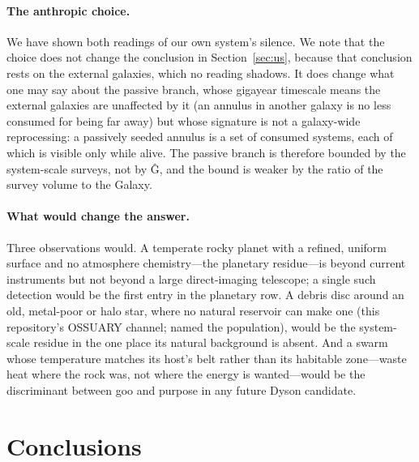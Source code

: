 \documentclass[11pt]{article}
\newcommand{\Ghat}{\^{G}\xspace}
\begin{document}
\paragraph{The anthropic choice.}  We have shown both readings of our own
system's silence.  We note that the choice does not change the conclusion in
Section~\ref{sec:us}, because that conclusion rests on the external galaxies,
which no reading shadows.  It does change what one may say about the passive
branch, whose gigayear timescale means the external galaxies are unaffected by
it (an annulus in another galaxy is no less consumed for being far away) but
whose signature is not a galaxy-wide reprocessing: a passively seeded annulus
is a set of consumed systems, each of which is visible only while alive.  The
passive branch is therefore bounded by the system-scale surveys, not by \Ghat,
and the bound is weaker by the ratio of the survey volume to the Galaxy.

\paragraph{What would change the answer.}  Three observations would.  A
temperate rocky planet with a refined, uniform surface and no atmosphere
chemistry---the planetary residue---is beyond current instruments but not
beyond a large direct-imaging telescope; a single such detection would be the
first entry in the planetary row.  A debris disc around an old, metal-poor or
halo star, where no natural reservoir can make one (this repository's
OSSUARY channel; \citealt{Lacki2025} named the population), would be the
system-scale residue in the one place its natural background is absent.  And
a swarm whose temperature matches its host's belt rather than its habitable
zone---waste heat where the rock was, not where the energy is wanted---would
be the discriminant between goo and purpose in any future Dyson candidate.

\section{Conclusions}
\label{sec:conclusions}
\end{document}
